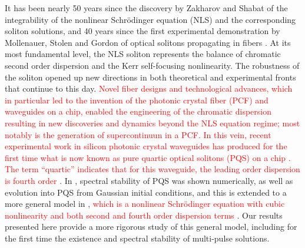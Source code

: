 \documentclass[12pt]{elsarticle}
\newcommand{\revised}[1]{ \textcolor{red}{#1} }
\begin{document}
It has been nearly 50 years since the discovery by Zakharov and Shabat \cite{Zak72} of the integrability of the nonlinear Schr\"odinger equation (NLS) and the corresponding soliton solutions, and 40 years since the first experimental demonstration by Mollenauer, Stolen and Gordon of optical solitons propagating in fibers \cite{Moll80}. At its most fundamental level, the NLS soliton represents the balance of chromatic second order dispersion and the Kerr self-focusing nonlinearity. The robustness of the soliton opened up new directions in both theoretical and experimental fronts that continue to this day. \revised{Novel fiber designs and technological advances, which in particular led to the invention of the photonic crystal fiber (PCF) and waveguides on a chip, enabled the engineering of the chromatic dispersion resulting in new discoveries and dynamics beyond the NLS equation regime; most notably is the generation of supercontinuun in a PCF. In this vein, recent experimental work in silicon photonic crystal waveguides has produced for the first time what is now known as pure quartic optical solitons (PQS) on a chip \cite{BlancoPQS}. The term ``quartic'' indicates that for this waveguide, the leading order dispersion is fourth order}. In \cite{Tam2019}, spectral stability of PQS was shown numerically, as well as evolution into PQS from Gaussian initial conditions, and this is extended to a more general model in \cite{Tam2020}, \revised{which is a nonlinear Schr{\"o}dinger equation with cubic nonlinearity and both second and fourth order dispersion terms}. Our results presented here provide a more rigorous study of this general model, including for the first time the existence and spectral stability of multi-pulse solutions.
\end{document}
